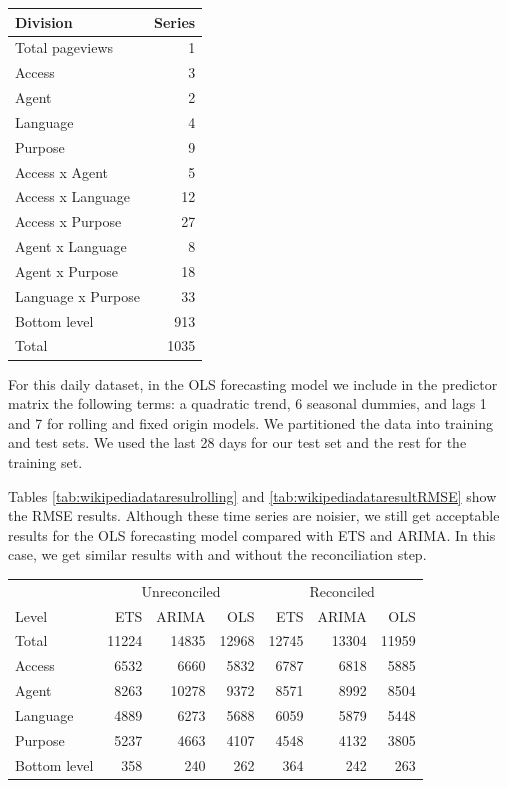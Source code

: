 \documentclass[11pt,a4paper,]{article}
\let\origtable\table
\let\endorigtable\endtable
\renewenvironment{table}[1][2] {
    \expandafter\origtable\expandafter[!htbp]
} {
    \endorigtable
}
\begin{document}
\begin{table}[!h]

\caption{\label{tab:wikidivision}Number of Wikipedia pageviews series at each aggregation level.}
\centering
\begin{tabular}[t]{lr}
\toprule
Division & Series\\
\midrule
Total pageviews & 1\\
Access & 3\\
Agent & 2\\
Language & 4\\
Purpose & 9\\
Access x Agent & 5\\
Access x Language & 12\\
Access x Purpose & 27\\
Agent x Language & 8\\
Agent x Purpose & 18\\
Language x Purpose & 33\\
Bottom level & 913\\
\hline
Total & 1035\\
\bottomrule
\end{tabular}
\end{table}

For this daily dataset, in the OLS forecasting model we include in the predictor matrix the following terms: a quadratic trend, 6 seasonal dummies, and lags 1 and 7 for rolling and fixed origin models. We partitioned the data into training and test sets. We used the last 28 days for our test set and the rest for the training set.

Tables \ref{tab:wikipediadataresulrolling} and \ref{tab:wikipediadataresultRMSE} show the RMSE results. Although these time series are noisier, we still get acceptable results for the OLS forecasting model compared with ETS and ARIMA. In this case, we get similar results with and without the reconciliation step.

\begin{table}[!h]

\caption{\label{tab:wikipediadataresulrolling}Mean RMSE for ETS, ARIMA and OLS with and without reconciliation - Rolling origin - Wikipedia dataset}
\centering
\begin{tabular}[t]{lrrrrrr}
\toprule
\multicolumn{1}{c}{} & \multicolumn{3}{c}{Unreconciled} & \multicolumn{3}{c}{Reconciled} \\
\cmidrule(l{3pt}r{3pt}){2-4} \cmidrule(l{3pt}r{3pt}){5-7}
Level & ETS & ARIMA & OLS & ETS & ARIMA & OLS\\
\midrule
Total & 11224 & 14835 & 12968 & 12745 & 13304 & 11959\\
Access & 6532 & 6660 & 5832 & 6787 & 6818 & 5885\\
Agent & 8263 & 10278 & 9372 & 8571 & 8992 & 8504\\
Language & 4889 & 6273 & 5688 & 6059 & 5879 & 5448\\
Purpose & 5237 & 4663 & 4107 & 4548 & 4132 & 3805\\
Bottom level & 358 & 240 & 262 & 364 & 242 & 263\\
\bottomrule
\end{tabular}
\end{table}
\end{document}
